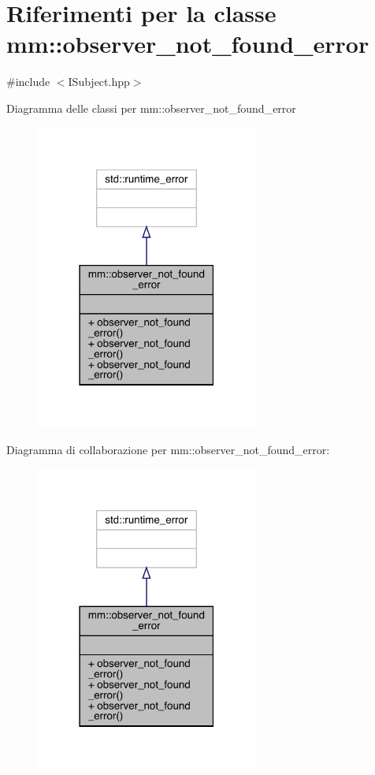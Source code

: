 \hypertarget{classmm_1_1observer__not__found__error}{}\section{Riferimenti per la classe mm\+:\+:observer\+\_\+not\+\_\+found\+\_\+error}
\label{classmm_1_1observer__not__found__error}


{\ttfamily \#include $<$I\+Subject.\+hpp$>$}



Diagramma delle classi per mm\+:\+:observer\+\_\+not\+\_\+found\+\_\+error\nopagebreak
\begin{figure}[H]
\begin{center}
\leavevmode
\includegraphics[width=207pt]{da/d02/classmm_1_1observer__not__found__error__inherit__graph}
\end{center}
\end{figure}


Diagramma di collaborazione per mm\+:\+:observer\+\_\+not\+\_\+found\+\_\+error\+:\nopagebreak
\begin{figure}[H]
\begin{center}
\leavevmode
\includegraphics[width=207pt]{d7/d18/classmm_1_1observer__not__found__error__coll__graph}
\end{center}
\end{figure}
